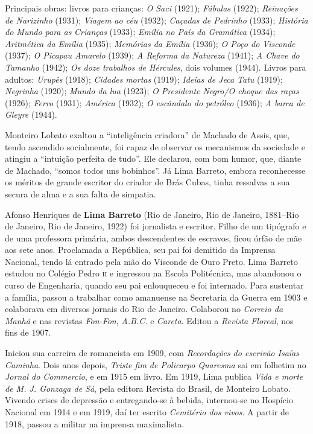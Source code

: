 Principais obras: livros para crianças: \emph{O Saci} (1921);
\emph{Fábulas} (1922); \emph{Reinações de Narizinho} (1931);
\emph{Viagem ao céu} (1932); \emph{Caçadas de Pedrinho} (1933);
\emph{História do Mundo para as} \emph{Crianças} (1933); \emph{Emília no
País da Gramática} (1934); \emph{Aritmética da Emília} (1935);
\emph{Memórias da Emília} (1936); \emph{O Poço do Visconde} (1937);
\emph{O Picapau Amarelo} (1939); \emph{A Reforma da Natureza} (1941);
\emph{A Chave do Tamanho} (1942); \emph{Os doze trabalhos de Hércules},
dois volumes (1944). Livros para adultos: \emph{Urupês} (1918);
\emph{Cidades} \emph{mortas} (1919); \emph{Ideias de Jeca Tatu} (1919);
\emph{Negrinha} (1920); \emph{Mundo da lua} (1923); \emph{O Presidente
Negro/O choque das raças} (1926); \emph{Ferro} (1931); \emph{América}
(1932); \emph{O escândalo do petróleo} (1936); \emph{A barca de Gleyre}
(1944).

Monteiro Lobato exaltou a ``inteligência criadora'' de Machado de Assis,
que, tendo ascendido socialmente, foi capaz de observar os mecanismos da
sociedade e atingiu a ``intuição perfeita de tudo''. Ele declarou, com
bom humor, que, diante de Machado, ``somos todos uns bobinhos''. Já Lima
Barreto, embora reconhecesse os méritos de grande escritor do criador de
Brás Cubas, tinha ressalvas a sua secura de alma e a sua falta de
simpatia.

Afonso Henriques de \textbf{Lima Barreto} (Rio de Janeiro, Rio de
Janeiro, 1881--Rio de Janeiro, Rio de Janeiro, 1922) foi jornalista e
escritor. Filho de um tipógrafo e de uma professora primária, ambos
descendentes de escravos, ficou órfão de mãe aos sete anos. Proclamada a
República, seu pai foi demitido da Imprensa Nacional, tendo lá entrado
pela mão do Visconde de Ouro Preto. Lima Barreto estudou no Colégio
Pedro \textsc{ii} e ingressou na Escola Politécnica, mas abandonou o curso de
Engenharia, quando seu pai enlouqueceu e foi internado. Para sustentar a
família, passou a trabalhar como amanuense na Secretaria da Guerra em
1903 e colaborava em diversos jornais do Rio de Janeiro. Colaborou no
\emph{Correio da Manhã} e nas revistas \emph{Fon-Fon}, \emph{A.B.C.} e
\emph{Careta}. Editou a \emph{Revista Floreal}, nos fins de 1907.

Iniciou sua carreira de romancista em 1909, com \emph{Recordações do
escrivão Isaías Caminha}. Dois anos depois, \emph{Triste fim de
Policarpo Quaresma} sai em folhetim no \emph{Jornal do Commercio}, e em
1915 em livro. Em 1919, Lima publica \emph{Vida e morte de M. J. Gonzaga
de Sá}, pela editora Revista do Brasil, de Monteiro Lobato. Vivendo
crises de depressão e entregando-se à bebida, internou-se no Hospício
Nacional em 1914 e em 1919, daí ter escrito \emph{Cemitério dos vivos}.
A partir de 1918, passou a militar na imprensa maximalista.

